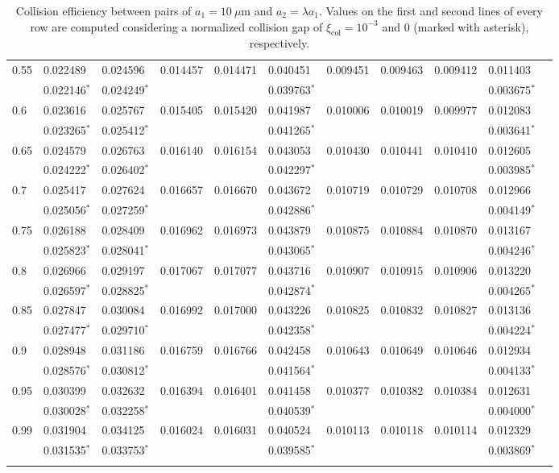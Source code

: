 \documentclass[../thesis.tex]{subfiles}
\begin{document}
\begin{landscape}
\begin{longtable}{lllllllllll}
 0.55 & 0.022489 & 0.024596 & 0.014457 & 0.014471 & 0.040451 & 0.009451 & 0.009463 & 0.009412 & 0.011403
 \\
 & 0.022146$^*$ & 0.024249$^*$ & & & 0.039763$^*$ & & & & 0.003675$^*$
 \\
 0.6 & 0.023616 & 0.025767 & 0.015405 & 0.015420 & 0.041987 & 0.010006 & 0.010019 & 0.009977 & 0.012083
 \\
 & 0.023265$^*$ & 0.025412$^*$ & & & 0.041265$^*$ & & & & 0.003641$^*$
 \\
 0.65 & 0.024579 & 0.026763 & 0.016140 & 0.016154 & 0.043053 & 0.010430 & 0.010441 & 0.010410 & 0.012605
 \\
 & 0.024222$^*$ & 0.026402$^*$ & & & 0.042297$^*$ & & & & 0.003985$^*$
 \\
 0.7 & 0.025417 & 0.027624 & 0.016657 & 0.016670 & 0.043672 & 0.010719 & 0.010729 & 0.010708 & 0.012966
 \\
 & 0.025056$^*$ & 0.027259$^*$ & & & 0.042886$^*$ & & & & 0.004149$^*$
 \\
 0.75 & 0.026188 & 0.028409 & 0.016962 & 0.016973 & 0.043879 & 0.010875 & 0.010884 & 0.010870 & 0.013167
 \\
 & 0.025823$^*$ & 0.028041$^*$ & & & 0.043065$^*$ & & & & 0.004246$^*$
 \\
 0.8 & 0.026966 & 0.029197 & 0.017067 & 0.017077 & 0.043716 & 0.010907 & 0.010915 & 0.010906 & 0.013220
 \\
 & 0.026597$^*$ & 0.028825$^*$ & & & 0.042874$^*$ & & & & 0.004265$^*$
 \\
 0.85 & 0.027847 & 0.030084 & 0.016992 & 0.017000 & 0.043226 & 0.010825 & 0.010832 & 0.010827 & 0.013136
 \\
 & 0.027477$^*$ & 0.029710$^*$ & & & 0.042358$^*$ & & & & 0.004224$^*$
 \\
 0.9 & 0.028948 & 0.031186 & 0.016759 & 0.016766 & 0.042458 & 0.010643 & 0.010649 & 0.010646 & 0.012934
 \\
 & 0.028576$^*$ & 0.030812$^*$ & & & 0.041564$^*$ & & & & 0.004133$^*$
 \\
 0.95 & 0.030399 & 0.032632 & 0.016394 & 0.016401 & 0.041458 & 0.010377 & 0.010382 & 0.010384 & 0.012631
 \\
 & 0.030028$^*$ & 0.032258$^*$ & & & 0.040539$^*$ & & & & 0.004000$^*$
 \\
 0.99 & 0.031904 & 0.034125 & 0.016024 & 0.016031 & 0.040524 & 0.010113 & 0.010118 & 0.010114 & 0.012329
 \\
 & 0.031535$^*$ & 0.033753$^*$ & & & 0.039585$^*$ & & & & 0.003869$^*$
 \\ \hline
 \caption{Collision efficiency between pairs of $a_1=10~\mu$m and $a_2=\lambda a_1$. Values on the first and second lines of every row are computed considering a normalized collision gap of $\xi_\text{col}=10^{-3}$ and $0$ (marked with asterisk), respectively.}
\label{tab:E10}
\end{longtable}%


\end{landscape}
\end{document}
